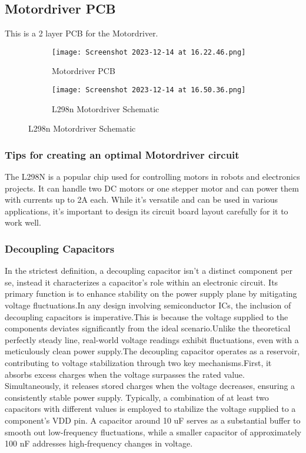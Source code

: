 \documentclass[../report.tex]{subfiles}
\begin{document}
\subsection{Motordriver PCB}
This is a 2 layer PCB for the Motordriver. 
\begin{figure}[H]
    \centering
    \begin{subfigure}[b]{0.4\linewidth}
      \texttt{[image: Screenshot 2023-12-14 at 16.22.46.png]}
      \caption{Motordriver PCB} 
    \end{subfigure}
    \begin{subfigure}[b]{0.4\linewidth}
      \texttt{[image: Screenshot 2023-12-14 at 16.50.36.png]}
      \caption{L298n Motordriver Schematic}
    \end{subfigure}
  \end{figure}

  \subsubsection*{Tips for creating an optimal Motordriver circuit}
  The L298N is a popular chip used for controlling motors in robots and electronics projects. It can handle two DC motors or one stepper motor and can power them with currents up to 2A each. While it's versatile and can be used in various applications, it's important to design its circuit board layout carefully for it to work well. 
 
  \subsubsection*{Decoupling Capacitors}
  In the strictest definition, a decoupling capacitor isn't a distinct component per se, instead it characterizes a capacitor's role within an electronic circuit. 
  Its primary function is to enhance stability on the power supply plane by mitigating voltage fluctuations.In any design involving semiconductor ICs, the inclusion of decoupling capacitors is imperative.This is because the voltage supplied to the components deviates significantly from the ideal scenario.Unlike the theoretical perfectly steady line, real-world voltage readings exhibit fluctuations, even with a meticulously clean power supply.The decoupling capacitor operates as a reservoir, contributing to voltage stabilization through two key mechanisms.First, it absorbs excess charges when the voltage surpasses the rated value. Simultaneously, it releases stored charges when the voltage decreases, ensuring a consistently stable power supply.
  Typically, a combination of at least two capacitors with different values is employed to stabilize the voltage supplied to a component's VDD pin. A capacitor around 10 uF serves as a substantial buffer to smooth out low-frequency fluctuations, while a smaller capacitor of approximately 100 nF addresses high-frequency changes in voltage. 
\end{document}
